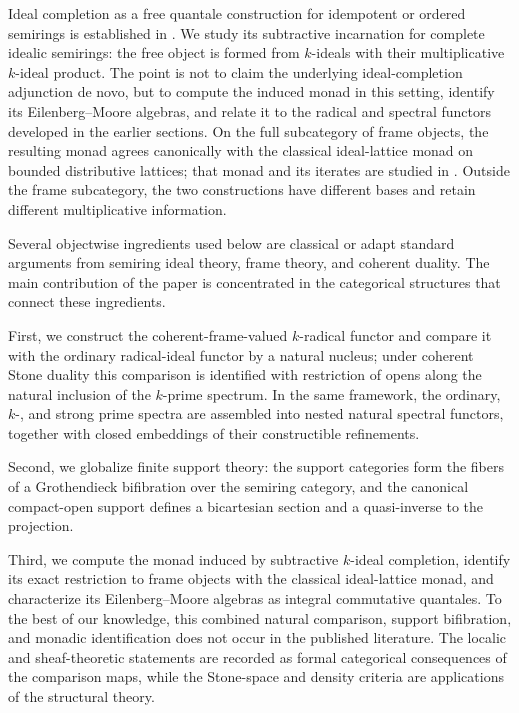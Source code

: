 \documentclass[12pt,leqno]{amsart}
\theoremstyle{definition}
\numberwithin{equation}{section}
\theoremstyle{remark}
\begin{document}
Ideal completion as a free quantale construction for idempotent or ordered semirings is established in \cite{NishizawaFurusawa14,Fujii23}. We study its subtractive incarnation for complete idealic semirings: the free object is formed from $k$-ideals with their multiplicative $k$-ideal product. The point is not to claim the underlying ideal-completion adjunction de novo, but to compute the induced monad in this setting, identify its Eilenberg--Moore algebras, and relate it to the radical and spectral functors developed in the earlier sections. On the full subcategory of frame objects, the resulting monad agrees canonically with the classical ideal-lattice monad on bounded distributive lattices; that monad and its iterates are studied in \cite{Johnstone,Razafindrakoto25}. Outside the frame subcategory, the two constructions have different bases and retain different multiplicative information.

Several objectwise ingredients used below are classical or adapt standard arguments from semiring ideal theory, frame theory, and coherent duality. The main contribution of the paper is concentrated in the categorical structures that connect these ingredients. 

First, we construct the coherent-frame-valued $k$-radical functor and compare it with the ordinary radical-ideal functor by a natural nucleus; under coherent Stone duality this comparison is identified with restriction of opens along the natural inclusion of the $k$-prime spectrum. In the same framework, the ordinary, $k$-, and strong prime spectra are assembled into nested natural spectral functors, together with closed embeddings of their constructible refinements. 

Second, we globalize finite support theory: the support categories form the fibers of a Grothendieck bifibration over the semiring category, and the canonical compact-open support defines a bicartesian section and a quasi-inverse to the projection. 

Third, we compute the monad induced by subtractive $k$-ideal completion, identify its exact restriction to frame objects with the classical ideal-lattice monad, and characterize its Eilenberg--Moore algebras as integral commutative quantales. To the best of our knowledge, this combined natural comparison, support bifibration, and monadic identification does not occur in the published literature. The localic and sheaf-theoretic statements are recorded as formal categorical consequences of the comparison maps, while the Stone-space and density criteria are applications of the structural theory.
\end{document}
